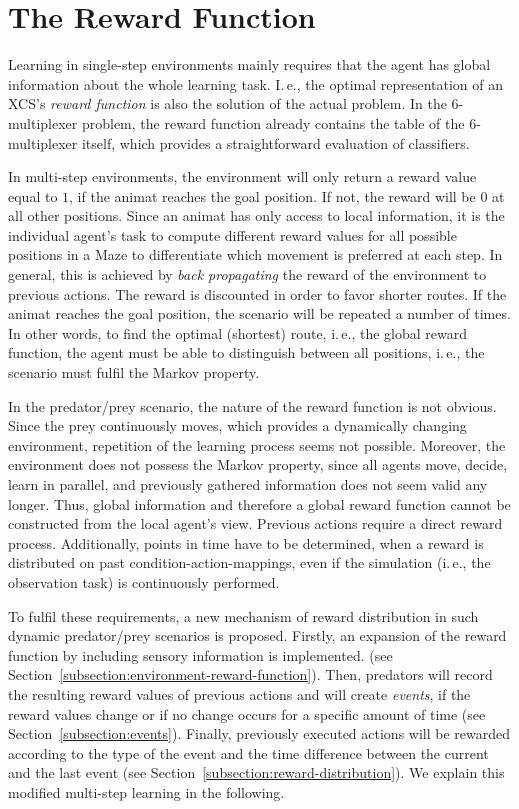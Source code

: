 \section{The Reward Function}
\label{section:the-reward-function}

Learning in single-step environments mainly requires that the agent has global information about the whole learning task. I.\,e., the optimal representation of an XCS's \emph{reward function} is also the solution of the actual problem. In the 6-multiplexer problem, the reward function already contains the table of the 6-multiplexer itself, which provides a straightforward evaluation of classifiers.

In multi-step environments, the environment will only return a reward value equal to $1$, if the animat reaches the goal position. If not, the reward will be $0$ at all other positions. Since an animat has only access to local information, it is the individual agent's task to compute different reward values for all possible positions in a Maze to differentiate which movement is preferred at each step. In general, this is achieved by \emph{back propagating} the reward of the environment to previous actions. The reward is discounted in order to favor shorter routes. If the animat reaches the goal position, the scenario will be repeated a number of times. In other words, to find the optimal (shortest) route, i.\,e., the global reward function, the agent must be able to distinguish between all positions, i.\,e., the scenario must fulfil the Markov property.

In the predator/prey scenario, the nature of the reward function is not obvious. Since the prey continuously moves, which provides a dynamically changing environment, repetition of the learning process seems not possible. Moreover, the environment does not possess the Markov property, since all agents move, decide, learn in parallel, and previously gathered information does not seem valid any longer. Thus, global information and therefore a global reward function cannot be constructed from the local agent's view. Previous actions require a direct reward process. Additionally, points in time have to be determined, when a reward is distributed on past condition-action-mappings, even if the simulation (i.\,e., the observation task) is continuously performed.

To fulfil these requirements, a new mechanism of reward distribution in such dynamic predator/prey scenarios is proposed. Firstly, an expansion of the reward function by including sensory information is implemented. 
(see Section~\ref{subsection:environment-reward-function}). Then, predators will record the resulting reward values of previous actions and will create \emph{events}, if the reward values change or if no change occurs for a specific amount of time (see Section~\ref{subsection:events}). Finally, previously executed actions will be rewarded according to the type of the event and the time difference between the current and the last event (see Section~\ref{subsection:reward-distribution}). We explain this modified multi-step learning in the following.



